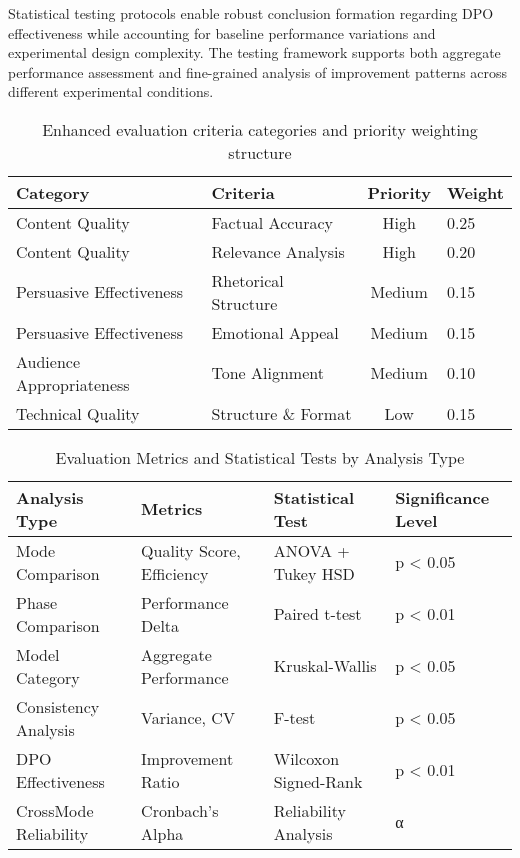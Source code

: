 Statistical testing protocols enable robust conclusion formation regarding DPO effectiveness while accounting for baseline performance variations and experimental design complexity. The testing framework supports both aggregate performance assessment and fine-grained analysis of improvement patterns across different experimental conditions.

\begin{table}[htbp]
    \centering
    \caption{Enhanced evaluation criteria categories and priority weighting structure}
    \label{tab:evaluation-criteria}
    \begin{tabular}{|l|l|c|l|}
    \hline
    \textbf{Category} & \textbf{Criteria} & \textbf{Priority} & \textbf{Weight} \\
    \hline
    Content Quality & Factual Accuracy & High & 0.25 \\
    Content Quality & Relevance Analysis & High & 0.20 \\
    Persuasive Effectiveness & Rhetorical Structure & Medium & 0.15 \\
    Persuasive Effectiveness & Emotional Appeal & Medium & 0.15 \\
    Audience Appropriateness & Tone Alignment & Medium & 0.10 \\
    Technical Quality & Structure \& Format & Low & 0.15 \\
    \hline
    \end{tabular}
\end{table}

\begin{table}[htbp]
    \centering
    \caption{Evaluation Metrics and Statistical Tests by Analysis Type}
    \label{tab:evaluation-metrics-tests}
    \begin{tabular}{|l|l|l|l|}
    \hline
    \textbf{Analysis Type} & \textbf{Metrics} & \textbf{Statistical Test} & \textbf{Significance Level} \\
    \hline
    Mode Comparison & Quality Score, Efficiency & ANOVA + Tukey HSD & p < 0.05 \\
    Phase Comparison & Performance Delta & Paired t-test & p < 0.01 \\
    Model Category & Aggregate Performance & Kruskal-Wallis & p < 0.05 \\
    Consistency Analysis & Variance, CV & F-test & p < 0.05 \\
    DPO Effectiveness & Improvement Ratio & Wilcoxon Signed-Rank & p < 0.01 \\
    Cross\-Mode Reliability & Cronbach's Alpha & Reliability Analysis & α \> 0.80 \\
    \hline
    \end{tabular}
\end{table}

